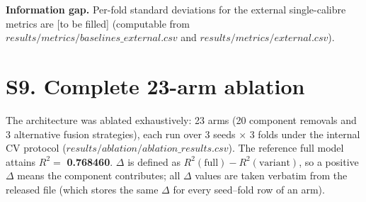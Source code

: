\documentclass[utf8]{frontiers_suppmat}
\begin{document}
\textbf{Information gap.} Per-fold standard deviations for the external single-calibre metrics are {[}to be filled{]} (computable from $results/metrics/baselines\_external.csv$ and $results/metrics/external.csv$).

\section{S9. Complete 23-arm ablation}

The architecture was ablated exhaustively: 23 arms (20 component removals and 3 alternative fusion strategies), each run over 3 seeds $\times$ 3 folds under the internal CV protocol ($results/ablation/ablation\_results.csv$). The reference full model attains $R^2 = $ \textbf{0.768460}. $\Delta$ is defined as $R^2(\text{full}) - R^2(\text{variant})$, so a positive $\Delta$ means the component contributes; all $\Delta$ values are taken verbatim from the released file (which stores the same $\Delta$ for every seed--fold row of an arm).
\end{document}
